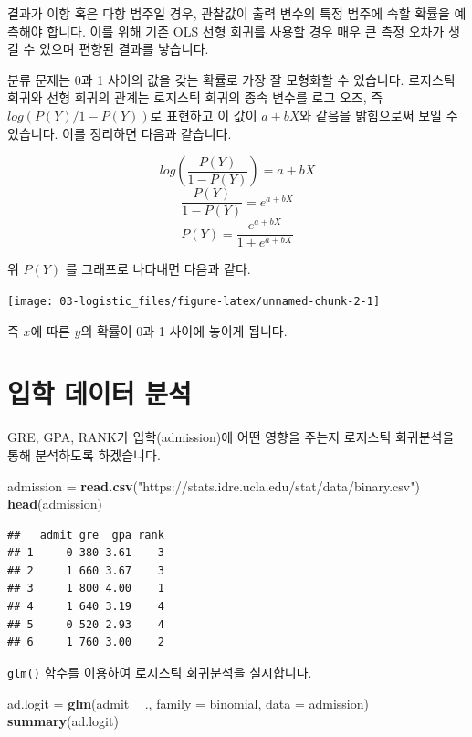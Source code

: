 \documentclass[12pt,]{book}
\newenvironment{Shaded}{\begin{snugshade}}{\end{snugshade}}
\newcommand{\DataTypeTok}[1]{\textcolor[rgb]{0.13,0.29,0.53}{#1}}
\newcommand{\KeywordTok}[1]{\textcolor[rgb]{0.13,0.29,0.53}{\textbf{#1}}}
\newcommand{\NormalTok}[1]{#1}
\newcommand{\OperatorTok}[1]{\textcolor[rgb]{0.81,0.36,0.00}{\textbf{#1}}}
\newcommand{\StringTok}[1]{\textcolor[rgb]{0.31,0.60,0.02}{#1}}
\begin{document}
결과가 이항 혹은 다항 범주일 경우, 관찰값이 출력 변수의 특정 범주에 속할 확률을 예측해야 합니다. 이를 위해 기존 OLS 선형 회귀를 사용할 경우 매우 큰 측정 오차가 생길 수 있으며 편향된 결과를 낳습니다.

분류 문제는 0과 1 사이의 값을 갖는 확률로 가장 잘 모형화할 수 있습니다. 로지스틱 회귀와 선형 회귀의 관계는 로지스틱 회귀의 종속 변수를 로그 오즈, 즉 \(log(P(Y) / 1-P(Y))\)로 표현하고 이 값이 \(a + bX\)와 같음을 밝힘으로써 보일 수 있습니다. 이를 정리하면 다음과 같습니다.

\[log(\frac{P(Y)}{1-P(Y)}) = a + bX\]
\[\frac{P(Y)}{1-P(Y)} = e^{a + bX}\]
\[ P(Y) = \frac{e^{a + bX}}{1 + e^{a + bX}}  \]

위 \(P(Y)\) 를 그래프로 나타내면 다음과 같다.

\begin{center}\texttt{[image: 03-logistic\_files/figure-latex/unnamed-chunk-2-1]} \end{center}

즉 \(x\)에 따른 \(y\)의 확률이 0과 1 사이에 놓이게 됩니다.

\hypertarget{uxc785uxd559-uxb370uxc774uxd130-uxbd84uxc11d}{%
\section{입학 데이터 분석}\label{uxc785uxd559-uxb370uxc774uxd130-uxbd84uxc11d}}

GRE, GPA, RANK가 입학(admission)에 어떤 영향을 주는지 로지스틱 회귀분석을 통해 분석하도록 하겠습니다.

\begin{Shaded}
\begin{Highlighting}[]
\NormalTok{admission =}\StringTok{ }\KeywordTok{read.csv}\NormalTok{(}\StringTok{"https://stats.idre.ucla.edu/stat/data/binary.csv"}\NormalTok{)}
\KeywordTok{head}\NormalTok{(admission)}
\end{Highlighting}
\end{Shaded}

\begin{verbatim}
##   admit gre  gpa rank
## 1     0 380 3.61    3
## 2     1 660 3.67    3
## 3     1 800 4.00    1
## 4     1 640 3.19    4
## 5     0 520 2.93    4
## 6     1 760 3.00    2
\end{verbatim}

\texttt{glm()} 함수를 이용하여 로지스틱 회귀분석을 실시합니다.

\begin{Shaded}
\begin{Highlighting}[]
\NormalTok{ad.logit =}\StringTok{ }\KeywordTok{glm}\NormalTok{(admit }\OperatorTok{~}\StringTok{ }\NormalTok{., }\DataTypeTok{family =}\NormalTok{ binomial, }\DataTypeTok{data =}\NormalTok{ admission)}
\KeywordTok{summary}\NormalTok{(ad.logit)}
\end{Highlighting}
\end{Shaded}
\end{document}
